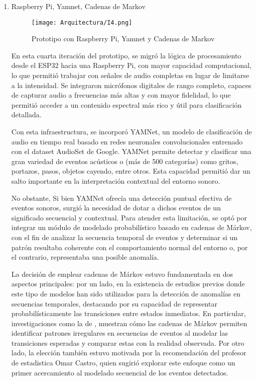 \begin{enumerate}
      \item Raspberry Pi, Yamnet, Cadenas de Markov

            \begin{figure}[ht!]
                  \centering
                  \texttt{[image: Arquitectura/I4.png]}
                  \caption{Prototipo con Raspberry Pi, Yamnet y Cadenas de Markov}
                  \label{fig:prototipo4}
            \end{figure}

            En esta cuarta iteración del prototipo, se migró la lógica de procesamiento desde el ESP32 hacia una Raspberry Pi, con mayor capacidad computacional, lo que permitió trabajar con señales de audio completas en lugar de limitarse a la intensidad. Se integraron micrófonos digitales de rango completo, capaces de capturar audio a frecuencias más altas y con mayor fidelidad, lo que permitió acceder a un contenido espectral más rico y útil para clasificación detallada.

            Con esta infraestructura, se incorporó YAMNet, un modelo de clasificación de audio en tiempo real basado en redes neuronales convolucionales entrenado con el dataset AudioSet de Google. YAMNet permite detectar y clasificar una gran variedad de eventos acústicos o (más de 500 categorías) como gritos, portazos, pasos, objetos cayendo, entre otros. Esta capacidad permitió dar un salto importante en la interpretación contextual del entorno sonoro.
 
            No obstante, Si bien YAMNet ofrecía una detección puntual efectiva de eventos sonoros, surgió la necesidad de dotar a dichos eventos de un significado secuencial y contextual. Para atender esta limitación, se optó por integrar un módulo de modelado probabilístico basado en cadenas de Márkov, con el fin de analizar la secuencia temporal de eventos y determinar si un patrón resultaba coherente con el comportamiento normal del entorno o, por el contrario, representaba una posible anomalía.

            La decisión de emplear cadenas de Márkov estuvo fundamentada en dos aspectos principales: por un lado, en la existencia de estudios previos donde este tipo de modelos han sido utilizados para la detección de anomalías en secuencias temporales, destacando por su capacidad de representar probabilísticamente las transiciones entre estados inmediatos. En particular, investigaciones como la de \citeauthor{boldt2020anomaly} \citeyear{boldt2020anomaly}, muestran cómo las cadenas de Márkov permiten identificar patrones irregulares en secuencias de eventos al modelar las transiciones esperadas y comparar estas con la realidad observada. Por otro lado, la elección también estuvo motivada por la recomendación del profesor de estadistica Omar Castro, quien sugirió explorar este enfoque como un primer acercamiento al modelado secuencial de los eventos detectados.


\end{enumerate}
